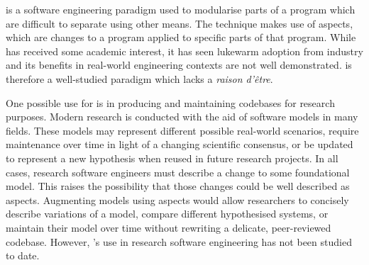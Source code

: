 
    \Aop{} is a software engineering paradigm used to modularise parts of a
    program which are difficult to separate using other means. The technique
    makes use of aspects, which are changes to a program applied to specific
    parts of that program. While \aop{} has received some academic interest, it
    has seen lukewarm adoption from industry and its benefits in real-world
    engineering contexts are not well demonstrated. \Aop{} is therefore a
    well-studied paradigm which lacks a \emph{raison d'\^etre}.
    
    One possible use for \aop{} is in producing and maintaining codebases for
    research purposes. Modern research is conducted with the aid of software
    models in many fields. These models may represent different possible
    real-world scenarios, require maintenance over time in light of a changing
    scientific consensus, or be updated to represent a new hypothesis when
    reused in future research projects. In all cases, research software
    engineers must describe a change to some foundational model. This raises the
    possibility that those changes could be well described as aspects.
    Augmenting models using aspects would allow researchers to concisely
    describe variations of a model, compare different hypothesised systems, or
    maintain their model over time without rewriting a delicate, peer-reviewed
    codebase. However, \aop{}'s use in research software engineering has not
    been studied to date.





